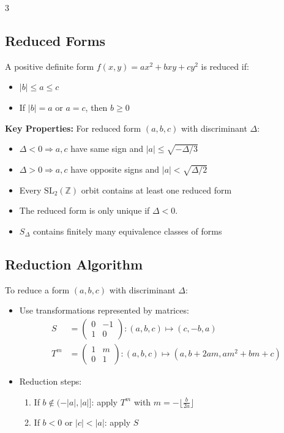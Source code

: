 \documentclass[8,a4paper]{article}
\begin{document}
\begin{multicols}{3}
	\subsection{Reduced Forms}
	A positive definite form $f(x,y) = ax^2 + bxy + cy^2$ is reduced if:
	\begin{itemize}[leftmargin=*, nosep]
		\item $|b| \leq a \leq c$
		\item If $|b| = a$ or $a = c$, then $b \geq 0$
	\end{itemize}

	\textbf{Key Properties:} For reduced form $(a,b,c)$ with discriminant $\Delta$:
	\begin{itemize}[leftmargin=*, nosep]
		\item $\Delta < 0 \Rightarrow a,c$ have same sign and $|a| \leq \sqrt{-\Delta/3}$
		\item $\Delta > 0 \Rightarrow a,c$ have opposite signs and $|a| < \sqrt{\Delta/2}$
		\item Every $\text{SL}_2(\mathbb{Z})$ orbit contains at least one reduced form
		\item The reduced form is only unique if $\Delta < 0$.
		\item $S_\Delta$ contains finitely many equivalence classes of forms
	\end{itemize}
	\subsection{Reduction Algorithm}
	To reduce a form $(a,b,c)$ with discriminant $\Delta$:
	\begin{itemize}[leftmargin=*, nosep]
		\item Use transformations represented by matrices:
		      \begin{align*}
			      S   & = \begin{pmatrix} 0 & -1 \\ 1 & 0 \end{pmatrix}: (a,b,c) \mapsto (c,-b,a)             \\
			      T^m & = \begin{pmatrix} 1 & m \\ 0 & 1 \end{pmatrix}: (a,b,c) \mapsto (a, b+2am, am^2+bm+c)
		      \end{align*}
		\item Reduction steps:
		      \begin{enumerate}[nosep]
			      \item If $b \notin (-|a|, |a|]$: apply $T^m$ with $m = -\lfloor \frac{b}{2a} \rfloor$
			      \item If $b < 0$ or $|c| < |a|$: apply $S$
		      \end{enumerate}
	\end{itemize}



\end{multicols}
\end{document}
